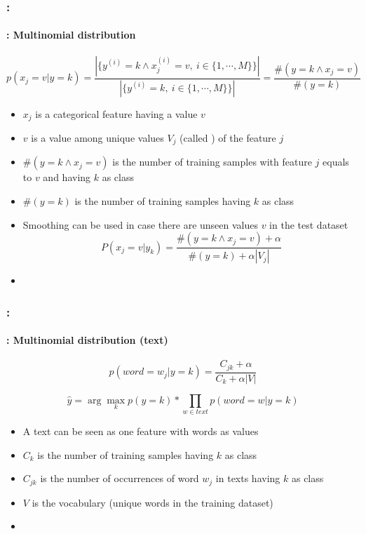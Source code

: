 \documentclass[xcolor=table]{beamer}
\begin{document}
\begin{frame}
	\frametitle{\insertshortsubtitle: \insertsection}
	\framesubtitle{\insertsubsection: Multinomial distribution}
	
	\[p(x_j = v|y=k) = \frac{|\{y^{(i)} = k \wedge x^{(i)}_j = v,\ i \in \{1, \cdots, M\}\}|}{|\{y^{(i)} = k,\ i \in \{1, \cdots, M\}\}|} = \frac{\#(y = k \wedge x_j = v)}{\#(y = k)}\]
	
	\begin{itemize}
		\item $x_j$ is a categorical feature having a value $ v $
		\item $v$ is a value among unique values $ V_j $ (called ) of the feature $j$
		\item $\#(y = k \wedge x_j = v)$ is the number of training samples with feature $j$ equals to $v$ and having $k$ as class
		\item $\#(y = k)$ is the number of training samples having $k$ as class
		\item Smoothing can be used in case there are unseen values $v$ in the test dataset
		\[P(x_j = v|y_k) = \frac{\#(y = k \wedge x_j = v) + \alpha}{\#(y = k) + \alpha |V_j|}\]
		\item {}
	\end{itemize}
	
\end{frame}

\begin{frame}
	\frametitle{\insertshortsubtitle: \insertsection}
	\framesubtitle{\insertsubsection: Multinomial distribution (text)}
	
	\[p(word = w_j|y=k) = \frac{C_{jk} + \alpha}{C_k + \alpha |V|}\]
	
	\vfill
	
	\[\hat{y} = \arg\max_{k} p(y=k) * \prod_{w \in text} p(word = w|y=k)\]
	
	\vfill
	
	\begin{itemize}
		\item A text can be seen as one feature with words as values
		\item $C_k$ is the number of training samples having $k$ as class
		\item $C_{jk}$ is the number of occurrences of word $w_j$ in texts having $k$ as class
		\item $V$ is the vocabulary (unique words in the training dataset)
		\item {}
	\end{itemize}
	
\end{frame}
\end{document}
